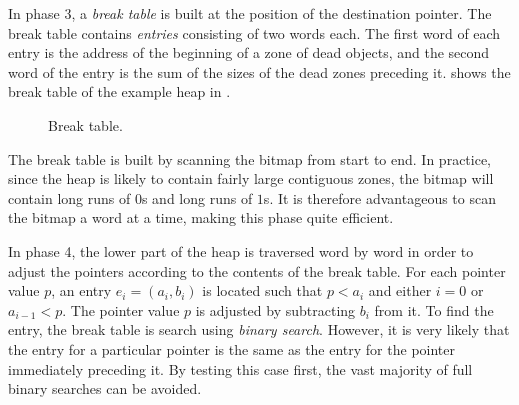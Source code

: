 In phase 3, a \emph{break table} is built at the position of the
destination pointer.  The break table contains \emph{entries}
consisting of two words each.  The first word of each entry is the
address of the beginning of a zone of dead objects, and the second
word of the entry is the sum of the sizes of the dead zones preceding
it.   shows the break table of the example heap
in .

\begin{figure}
\begin{center}
\end{center}
\caption{\label{fig-example-d}
Break table.}
\end{figure}

The break table is built by scanning the bitmap from start to end.  In
practice, since the heap is likely to contain fairly large contiguous
zones, the bitmap will contain long runs of $0$s and long runs of
$1$s.  It is therefore advantageous to scan the bitmap a word at a
time, making this phase quite efficient. 

In phase 4, the lower part of the heap is traversed word by word in
order to adjust the pointers according to the contents of the break
table.  For each pointer value $p$, an entry $e_i = (a_i,b_i)$ is
located such that $p < a_i$ and either $i = 0$ or $a_{i-1} < p$.  The
pointer value $p$ is adjusted by subtracting $b_i$ from it.  To find
the entry, the break table is search using \emph{binary search}.
However, it is very likely that the entry for a particular pointer is
the same as the entry for the pointer immediately preceding it.  By
testing this case first, the vast majority of full binary searches can
be avoided. 

